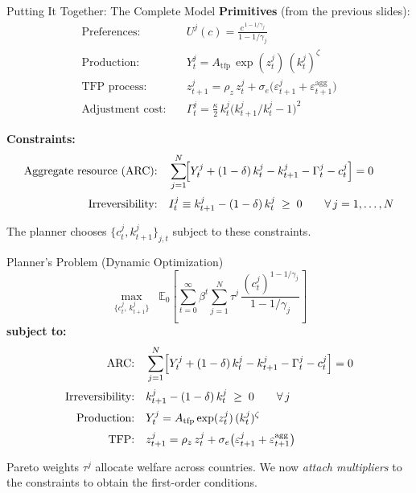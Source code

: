 \documentclass[aspectratio=169,11pt]{beamer}
\begin{document}
\begin{frame}{Putting It Together: The Complete Model}
\footnotesize
\textbf{Primitives} (from the previous slides):
\begin{align*}
\text{Preferences:}   &\quad U^j(c) = \tfrac{c^{\,1 - 1/\gamma_j}}{1 - 1/\gamma_j} \\[1pt]
\text{Production:}    &\quad Y_t^j = A_{\mathrm{tfp}}\,\exp(z_t^j)\,(k_t^j)^{\zeta} \\[1pt]
\text{TFP process:}   &\quad z_{t+1}^j = \rho_z\, z_t^j + \sigma_e\bigl(\varepsilon_{t+1}^j + \varepsilon_{t+1}^{\mathrm{agg}}\bigr) \\[1pt]
\text{Adjustment cost:}&\quad \Gamma_t^j = \tfrac{\kappa}{2}\, k_t^j \bigl(k_{t+1}^j/k_t^j - 1\bigr)^{2}
\end{align*}

\textbf{Constraints:}
\begin{align*}
\text{Aggregate resource (ARC):} &\quad \sum_{j=1}^{N}\!\Bigl[ Y_t^j + (1-\delta)\, k_t^j - k_{t+1}^j - \Gamma_t^j - c_t^j \Bigr] = 0 \\[2pt]
\text{Irreversibility:} &\quad I_t^j \equiv k_{t+1}^j - (1-\delta)\, k_t^j \;\geq\; 0 \qquad \forall\, j = 1,\ldots,N
\end{align*}

\smallskip
The planner chooses $\{c_t^j, k_{t+1}^j\}_{j,t}$ subject to these constraints.
\end{frame}

\begin{frame}{Planner's Problem (Dynamic Optimization)}
\footnotesize
\[
\max_{\{c_t^j,\, k_{t+1}^j\}} \;\; \mathbb{E}_0\!\left[\sum_{t=0}^{\infty} \beta^{t} \sum_{j=1}^{N} \tau^j \, \frac{(c_t^j)^{1 - 1/\gamma_j}}{1 - 1/\gamma_j}\right]
\]
\textbf{subject to:}
\begin{align*}
\text{ARC:} &\quad \sum_{j=1}^{N} \Bigl[ Y_t^j + (1-\delta)\,k_t^j - k_{t+1}^j - \Gamma_t^j - c_t^j \Bigr] = 0 \\[2pt]
\text{Irreversibility:} &\quad k_{t+1}^j - (1-\delta)\,k_t^j \;\geq\; 0 \qquad \forall\, j \\[2pt]
\text{Production:} &\quad Y_t^j = A_{\mathrm{tfp}}\exp(z_t^j)\,(k_t^j)^{\zeta} \\[2pt]
\text{TFP:}         &\quad z_{t+1}^j = \rho_z\, z_t^j + \sigma_e\bigl(\varepsilon_{t+1}^j + \varepsilon_{t+1}^{\mathrm{agg}}\bigr)
\end{align*}

\smallskip
Pareto weights $\tau^j$ allocate welfare across countries. We now \emph{attach multipliers} to the constraints to obtain the first-order conditions.
\end{frame}
\end{document}
